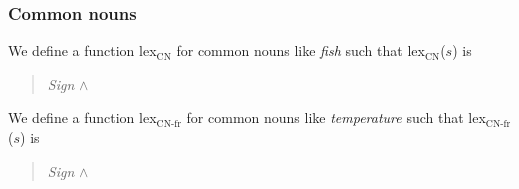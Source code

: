 \subsubsection{Common nouns}
We define a function lex$_{\mathrm{CN}}$ for common nouns like
\textit{fish} \label{pg:lexicon-cn} such that
lex$_{\mathrm{CN}}$($s$) is
\begin{quote}
\textit{Sign} \d{$\wedge$} \\

\end{quote}

We define a function lex$_{\mathrm{CN}\textrm{-}\mathrm{fr}}$ for common nouns like
\textit{temperature} such that
lex$_{\mathrm{CN}\textrm{-}\mathrm{fr}}$($s$) is
\begin{quote}
\textit{Sign} \d{$\wedge$} \\

\end{quote}

